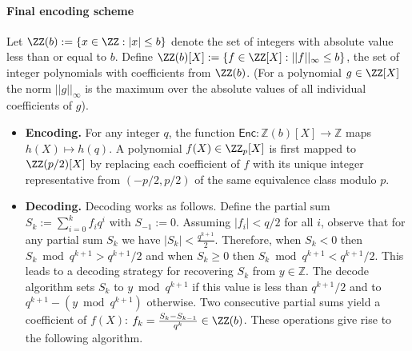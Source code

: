\paragraph{Final encoding scheme} Let $\ZZ(b):=\{x \in \ZZ: \vert x \vert  \leq b\}$ denote the set of integers with absolute value less than or equal to $b$.  Define $\ZZ(b)[X] := \{f \in \ZZ[X]: ||f||_\infty \leq b\}$, the set of integer polynomials with coefficients from $\ZZ(b)$. (For a polynomial $g \in \ZZ[X]$ the norm $||g||_\infty$ is the maximum over the absolute values of all individual coefficients of $g$).
\begin{itemize} 

\item \textbf{Encoding.}
For any integer $q$, the function $\mathsf{Enc} : \mathbb{Z}(b)[X] \rightarrow \mathbb{Z}$ maps $h(X) \mapsto h(q)$. A polynomial $f(X) \in \ZZ_p[X]$ is first mapped to $\ZZ(p/2)[X]$ by replacing each coefficient of $f$ with its unique integer representative from $(-p/2,p/2)$ of the same equivalence class modulo $p$.  %

\item \textbf{Decoding.}
Decoding works as follows. Define the partial sum $S_k := \sum_{i=0}^k f_i q^i$ with $S_{-1} := 0$. Assuming $|f_i| < q/2$ for all $i$, observe that for any partial sum $S_k$ we have $|S_k|<\frac{q^{k+1}}{2}$. Therefore, when $S_k < 0$ then $S_k \bmod q^{k+1} > q^{k+1}/2$ and when $S_k \geq 0$ then $S_k \bmod q^{k+1} < q^{k+1}/2$. 
This leads to a decoding strategy for recovering $S_k$ from $y \in \mathbb{Z}$. The decode algorithm sets $S_k$ to $y \bmod q^{k+1}$ if this value is less than $q^{k+1}/2$ and to $q^{k+1}- (y \bmod q^{k+1})$ otherwise.
Two consecutive partial sums yield a coefficient of $f(X)$: $f_k = \frac{S_{k} - S_{k-1}}{q^{k}} \in \ZZ(b)$. These operations give rise to the following algorithm.\\
\end{itemize}

